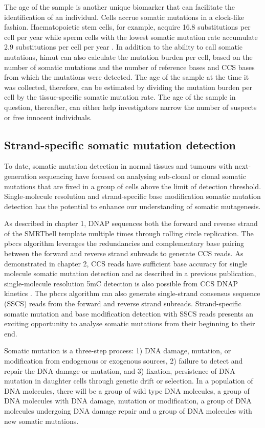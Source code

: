 The age of the sample is another unique biomarker that can facilitate the identification of an individual. Cells accrue somatic mutations in a clock-like fashion. Haematopoietic stem cells, for example, acquire 16.8 substitutions per cell per year \cite{} while sperm cells with the lowest somatic mutation rate accumulate 2.9 substitutions per cell per year \cite{}. In addition to the ability to call somatic mutations, himut can also calculate the mutation burden per cell, based on the number of somatic mutations and the number of reference bases and CCS bases from which the mutations were detected. The age of the sample at the time it was collected, therefore, can be estimated by dividing the mutation burden per cell by the tissue-specific somatic mutation rate. The age of the sample in question, thereafter, can either help investigators narrow the number of suspects or free innocent individuals.  


\subsection{Strand-specific somatic mutation detection}

To date, somatic mutation detection in normal tissues and tumours with next-generation sequencing have focused on analysing sub-clonal or clonal somatic mutations that are fixed in a group of cells above the limit of detection threshold. Single-molecule resolution and strand-specific base modification somatic mutation detection has the potential to enhance our understanding of somatic mutagenesis.

As described in chapter 1, DNAP sequences both the forward and reverse strand of the SMRTbell template multiple times through rolling circle replication. The pbccs algorithm leverages the redundancies and complementary base pairing between the forward and reverse strand subreads to generate CCS reads. As demonstrated in chapter 2, CCS reads have sufficient base accuracy for single molecule somatic mutation detection and as described in a previous publication, single-molecule resolution 5mC detection is also possible from CCS DNAP kinetics \cite{Vong2019-bi, Tse2021-or}. The pbccs algorithm can also generate single-strand consensus sequence (SSCS) reads from the forward and reverse strand subreads. Strand-specific somatic mutation and base modification detection with SSCS reads presents an exciting opportunity to analyse somatic mutations from their beginning to their end. 

Somatic mutation is a three-step process: 1) DNA damage, mutation, or modification from endogenous or exogenous sources, 2) failure to detect and repair the DNA damage or mutation, and 3) fixation, persistence of DNA mutation in daughter cells through genetic drift or selection. In a population of DNA molecules, there will be a group of wild type DNA molecules, a group of DNA molecules with DNA damage, mutation or modification, a group of DNA molecules undergoing DNA damage repair and a group of DNA molecules with new somatic mutations. 

